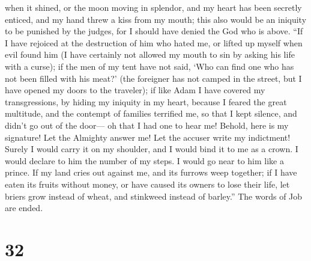 when it shined, or the moon moving in splendor,  and my
heart has been secretly enticed, and my hand threw a kiss from my mouth;
 this also would be an iniquity to be punished by the
judges, for I should have denied the God who is above. 
``If I have rejoiced at the destruction of him who hated me, or lifted
up myself when evil found him  (I have certainly not
allowed my mouth to sin by asking his life with a curse);
 if the men of my tent have not said, `Who can find one
who has not been filled with his meat?'  (the foreigner
has not camped in the street, but I have opened my doors to the
traveler);  if like Adam I have covered my
transgressions, by hiding my iniquity in my heart, 
because I feared the great multitude, and the contempt of families
terrified me, so that I kept silence, and didn't go out of the door---
 oh that I had one to hear me! Behold, here is my
signature! Let the Almighty answer me! Let the accuser write my
indictment!  Surely I would carry it on my shoulder, and
I would bind it to me as a crown.  I would declare to him
the number of my steps. I would go near to him like a prince.
 If my land cries out against me, and its furrows weep
together;  if I have eaten its fruits without money, or
have caused its owners to lose their life,  let briers
grow instead of wheat, and stinkweed instead of barley.'' The words of
Job are ended.

\hypertarget{section-22}{%
\section{32}\label{section-22}}

